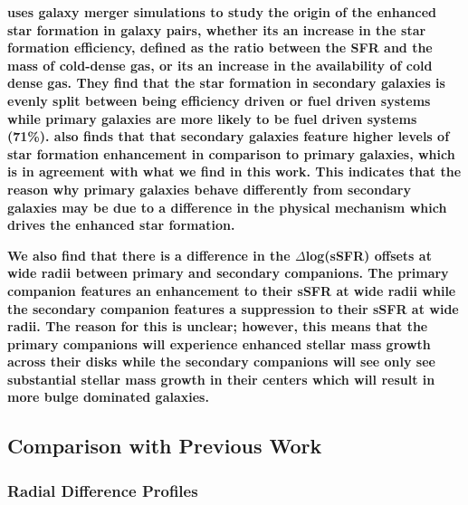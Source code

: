 \documentclass[iop,revtex4,twocolumn,apj,numberedappendix,appendixfloats]{emulateapj}
\begin{document}
\textbf{
\citet{Moreno:2020} uses galaxy merger simulations to study the origin of the enhanced star formation in galaxy pairs, whether its an increase in the star formation efficiency, defined as the ratio between the SFR and the mass of cold-dense gas, or its an increase in the availability of cold dense gas. They find that the star formation in secondary galaxies is evenly split between being efficiency driven or fuel driven systems while primary galaxies are more likely to be fuel driven systems (71\%). \citet{Moreno:2020} also finds that that secondary galaxies feature higher levels of star formation enhancement in comparison to primary galaxies, which is in agreement with what we find in this work. This indicates that the reason why primary galaxies behave differently from secondary galaxies may be due to a difference in the physical mechanism which drives the enhanced star formation. 
}

\textbf{
We also find that there is a difference in the $\Delta$log(sSFR) offsets at wide radii between primary and secondary companions. The primary companion features an enhancement to their sSFR at wide radii while the secondary companion features a suppression to their sSFR at wide radii. The reason for this is unclear; however, this means that the primary companions will experience enhanced stellar mass growth across their disks while the secondary companions will see only see substantial stellar mass growth in their centers which will result in more bulge dominated galaxies.
}

\subsection{Comparison with Previous Work}

\subsubsection{Radial Difference Profiles}
\end{document}
